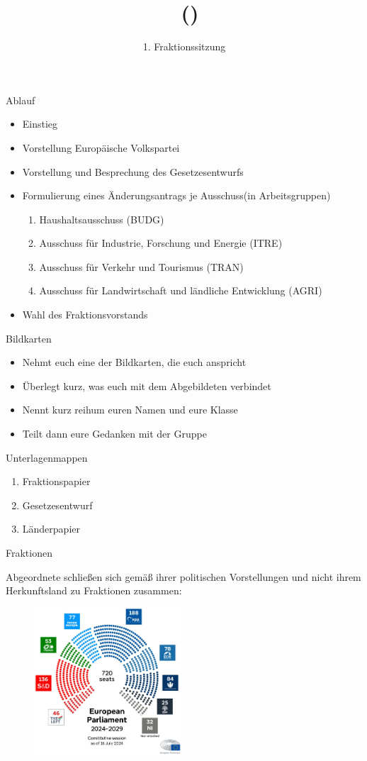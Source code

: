 \documentclass{beamer}
\title{\Fraktionsname\ (\Fraktionskuerzel)}
\subtitle{1. Fraktionssitzung}
\date{\datum}
\newcommand{\Fraktionsname}{Europäische Volkspartei}
\newcommand{\Fraktionsname}{Progressive Allianz der Sozialdemokraten}
\newcommand{\Fraktionsname}{Renew Europe}
\newcommand{\Fraktionsname}{Die Grünen/Europäische Freie Allianz}
\newcommand{\Fraktionsname}{Patrioten für Europa}
\newcommand{\ausschuesse}{
   		     \begin{enumerate}
        		    \item Haushaltsausschuss (BUDG)
            		\item Ausschuss für Industrie, Forschung und Energie (ITRE)
    	    		    \item Ausschuss für Verkehr und Tourismus (TRAN)
    		        \item Ausschuss für Landwirtschaft und ländliche Entwicklung (AGRI)
	        \end{enumerate}
		}
\newcommand{\entwurf}{Gesetzesentwurf}
\newcommand{\ausschuesse}{
            \begin{enumerate}
                \item Haushaltsausschuss (BUDG)
				\item Ausschuss für Beschäftigung und soziale Angelegenheiten (EMPL)
                \item Unterausschuss für Menschenrechte (DROI)
				\item Ausschuss für bürgerliche Freiheiten, Justiz und Inneres (LIBE)
            \end{enumerate}
    		}
\newcommand{\entwurf}{Gesetzesentwurf}
\newcommand{\ausschuesse}{
            \begin{enumerate}
                \item Haushaltsausschuss (BUDG)
                \item Ausschuss für bürgerliche Freiheiten, Justiz und Inneres (LIBE)
                \item Ausschuss für Sicherheit und Verteidigung (SEDE)
            \end{enumerate}
    		}
\newcommand{\entwurf}{Entschließungsentwurf}
\begin{document}
\frame{\titlepage}

\begin{frame}{Ablauf}
\vspace{-1.5cm}
\begin{itemize}
    \item Einstieg
    \item Vorstellung \Fraktionsname
    \item Vorstellung und Besprechung des Gesetzesentwurfs
    \item Formulierung eines Änderungsantrags je Ausschuss\newline (in Arbeitsgruppen)
    \ausschuesse
    \item Wahl des Fraktionsvorstands
\end{itemize}
\end{frame}

\begin{frame}{Bildkarten}
\vspace{-1cm}
\begin{itemize}
    \item Nehmt euch eine der Bildkarten, die euch anspricht
    \item Überlegt kurz, was euch mit dem Abgebildeten verbindet
    \item Nennt kurz reihum euren Namen und eure Klasse
    \item Teilt dann eure Gedanken mit der Gruppe
\end{itemize}
\end{frame}

\begin{frame}{Unterlagenmappen}
\vspace{-1cm}
\begin{enumerate}
    \item Fraktionspapier
    \item \entwurf
    \item Länderpapier
\end{enumerate}
\end{frame}

\begin{frame}{Fraktionen}
\vspace{-0.5cm}
\begin{center}
    Abgeordnete schließen sich gemäß ihrer politischen Vorstellungen und nicht ihrem Herkunftsland zu Fraktionen zusammen:
\end{center}
\begin{figure}[h]
    \centering
    \includegraphics[height=5.5cm]{Bilder/EP_seats.jpg}
\end{figure}
\end{frame}
\end{document}
